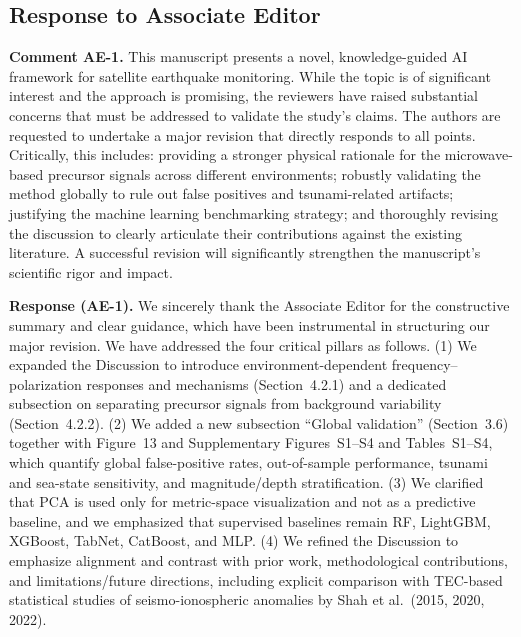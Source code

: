 \documentclass[12pt]{article}
\newcommand{\revcomment}[1]{\begingroup\color{commentcolor}#1\endgroup}
\newcommand{\revresponse}[1]{\begingroup\color{responsecolor}#1\endgroup}
\begin{document}
\subsection*{Response to Associate Editor}

\revcomment{%
\textbf{Comment AE-1.} This manuscript presents a novel, knowledge-guided AI framework for satellite earthquake monitoring. While the topic is of significant interest and the approach is promising, the reviewers have raised substantial concerns that must be addressed to validate the study's claims. The authors are requested to undertake a major revision that directly responds to all points. Critically, this includes: providing a stronger physical rationale for the microwave-based precursor signals across different environments; robustly validating the method globally to rule out false positives and tsunami-related artifacts; justifying the machine learning benchmarking strategy; and thoroughly revising the discussion to clearly articulate their contributions against the existing literature. A successful revision will significantly strengthen the manuscript's scientific rigor and impact.
}

\revresponse{%
\textbf{Response (AE-1).} We sincerely thank the Associate Editor for the constructive summary and clear guidance, which have been instrumental in structuring our major revision. We have addressed the four critical pillars as follows. (1) We expanded the Discussion to introduce environment-dependent frequency--polarization responses and mechanisms (Section~4.2.1) and a dedicated subsection on separating precursor signals from background variability (Section~4.2.2). (2) We added a new subsection ``Global validation'' (Section~3.6) together with Figure~13 and Supplementary Figures~S1--S4 and Tables~S1--S4, which quantify global false-positive rates, out-of-sample performance, tsunami and sea-state sensitivity, and magnitude/depth stratification. (3) We clarified that PCA is used only for metric-space visualization and not as a predictive baseline, and we emphasized that supervised baselines remain RF, LightGBM, XGBoost, TabNet, CatBoost, and MLP. (4) We refined the Discussion to emphasize alignment and contrast with prior work, methodological contributions, and limitations/future directions, including explicit comparison with TEC-based statistical studies of seismo-ionospheric anomalies by Shah et al.~(2015, 2020, 2022).
}
\end{document}
